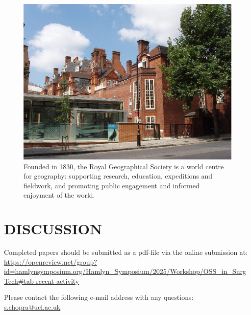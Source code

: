 \documentclass[a4paper, 10 pt, conference]{hsmrw}
\begin{document}
\begin{figure}[t]
\centering
\includegraphics[width=\columnwidth]{examplefig.png}
\caption{Founded in 1830, the Royal Geographical Society is a world centre for geography: supporting research, education, expeditions and fieldwork, and promoting public engagement and informed enjoyment of the world.}
\label{fig_example}
\end{figure}

\section*{DISCUSSION}
Completed papers should be submitted as a pdf-file via the online submission at: \url{https://openreview.net/group?id=hamlynsymposium.org/Hamlyn_Symposium/2025/Workshop/OSS_in_SurgTech#tab-recent-activity}

Please contact the following e-mail address with any questions: \href{mailto:s.chopra@ucl.ac.uk}{s.chopra@ucl.ac.uk} 

\nocite{*}


\end{document}
